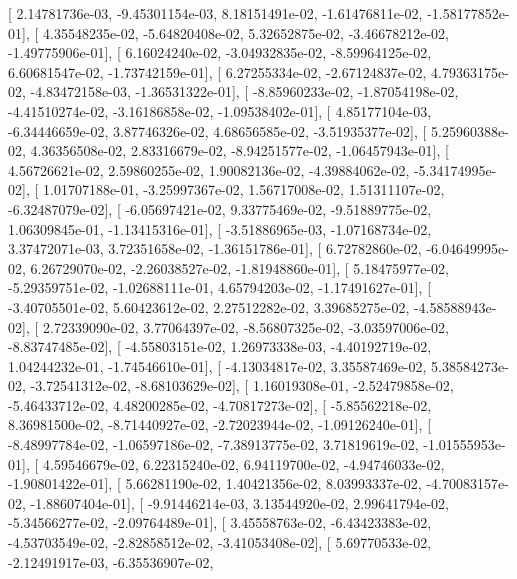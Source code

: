 \documentclass{article}
\begin{document}
       [  2.14781736e-03,  -9.45301154e-03,   8.18151491e-02,
         -1.61476811e-02,  -1.58177852e-01],
       [  4.35548235e-02,  -5.64820408e-02,   5.32652875e-02,
         -3.46678212e-02,  -1.49775906e-01],
       [  6.16024240e-02,  -3.04932835e-02,  -8.59964125e-02,
          6.60681547e-02,  -1.73742159e-01],
       [  6.27255334e-02,  -2.67124837e-02,   4.79363175e-02,
         -4.83472158e-03,  -1.36531322e-01],
       [ -8.85960233e-02,  -1.87054198e-02,  -4.41510274e-02,
         -3.16186858e-02,  -1.09538402e-01],
       [  4.85177104e-03,  -6.34446659e-02,   3.87746326e-02,
          4.68656585e-02,  -3.51935377e-02],
       [  5.25960388e-02,   4.36356508e-02,   2.83316679e-02,
         -8.94251577e-02,  -1.06457943e-01],
       [  4.56726621e-02,   2.59860255e-02,   1.90082136e-02,
         -4.39884062e-02,  -5.34174995e-02],
       [  1.01707188e-01,  -3.25997367e-02,   1.56717008e-02,
          1.51311107e-02,  -6.32487079e-02],
       [ -6.05697421e-02,   9.33775469e-02,  -9.51889775e-02,
          1.06309845e-01,  -1.13415316e-01],
       [ -3.51886965e-03,  -1.07168734e-02,   3.37472071e-03,
          3.72351658e-02,  -1.36151786e-01],
       [  6.72782860e-02,  -6.04649995e-02,   6.26729070e-02,
         -2.26038527e-02,  -1.81948860e-01],
       [  5.18475977e-02,  -5.29359751e-02,  -1.02688111e-01,
          4.65794203e-02,  -1.17491627e-01],
       [ -3.40705501e-02,   5.60423612e-02,   2.27512282e-02,
          3.39685275e-02,  -4.58588943e-02],
       [  2.72339090e-02,   3.77064397e-02,  -8.56807325e-02,
         -3.03597006e-02,  -8.83747485e-02],
       [ -4.55803151e-02,   1.26973338e-03,  -4.40192719e-02,
          1.04244232e-01,  -1.74546610e-01],
       [ -4.13034817e-02,   3.35587469e-02,   5.38584273e-02,
         -3.72541312e-02,  -8.68103629e-02],
       [  1.16019308e-01,  -2.52479858e-02,  -5.46433712e-02,
          4.48200285e-02,  -4.70817273e-02],
       [ -5.85562218e-02,   8.36981500e-02,  -8.71440927e-02,
         -2.72023944e-02,  -1.09126240e-01],
       [ -8.48997784e-02,  -1.06597186e-02,  -7.38913775e-02,
          3.71819619e-02,  -1.01555953e-01],
       [  4.59546679e-02,   6.22315240e-02,   6.94119700e-02,
         -4.94746033e-02,  -1.90801422e-01],
       [  5.66281190e-02,   1.40421356e-02,   8.03993337e-02,
         -4.70083157e-02,  -1.88607404e-01],
       [ -9.91446214e-03,   3.13544920e-02,   2.99641794e-02,
         -5.34566277e-02,  -2.09764489e-01],
       [  3.45558763e-02,  -6.43423383e-02,  -4.53703549e-02,
         -2.82858512e-02,  -3.41053408e-02],
       [  5.69770533e-02,  -2.12491917e-03,  -6.35536907e-02,
\end{document}
